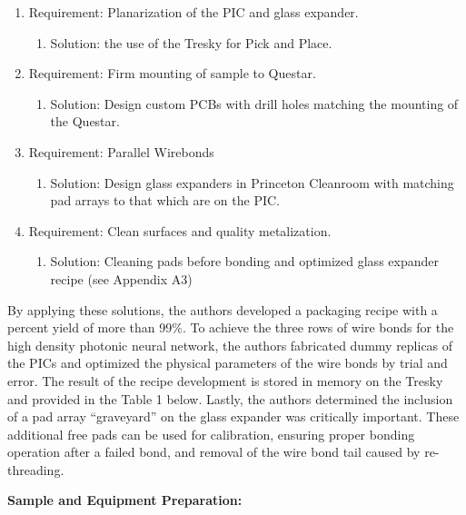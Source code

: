 \begin{enumerate}
    \item Requirement: Planarization of the PIC and glass expander.
    \begin{enumerate}
        \item Solution: the use of the Tresky for Pick and Place.
    \end{enumerate}
    \item Requirement: Firm mounting of sample to Questar.
    \begin{enumerate}
        \item Solution: Design custom PCBs with drill holes matching the mounting of the Questar.
    \end{enumerate}
    \item Requirement: Parallel Wirebonds
    \begin{enumerate}
        \item Solution: Design glass expanders in Princeton Cleanroom with matching pad arrays to that which are on the PIC.
    \end{enumerate}
    \item Requirement: Clean surfaces and quality metalization. 
    \begin{enumerate}
        \item Solution: Cleaning pads before bonding and optimized glass expander recipe (see Appendix A3)
    \end{enumerate}
\end{enumerate}

\qquad By applying these solutions, the authors developed a packaging recipe with a percent yield of more than 99\%. To achieve the three rows of wire bonds for the high density photonic neural network, the authors fabricated dummy replicas of the PICs and optimized the physical parameters of the wire bonds by trial and error. The result of the recipe development is stored in memory on the Tresky and provided in the Table 1 below. Lastly, the authors determined the inclusion of a pad array “graveyard” on the glass expander was critically important. These additional free pads can be used for calibration, ensuring proper bonding operation after a failed bond, and removal of the wire bond tail caused by re-threading. 

\textbf{Sample and Equipment Preparation:}

